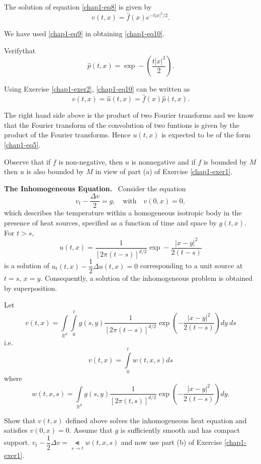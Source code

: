 The solution of equation \eqref{chap1-eq8} is given by
\begin{equation*}
v(t,x)=\hat{f}(x)e^{-t|x|^{2}/2}.\tag{10}\label{chap1-eq10}
\end{equation*}

We have used \eqref{chap1-eq9} in obtaining \eqref{chap1-eq10}.

\begin{exercise}\label{chap1-exer2}
Verify\pageoriginale that 
$$
\hat{p}(t,x)=\exp -\left(\frac{t|x|^{2}}{2}\right).
$$
\end{exercise}

Using Exercise \ref{chap1-exer2}, \eqref{chap1-eq10} can be written as
\begin{equation*}
v(t,x)=\hat{u}(t,x)=\hat{f}(x)\hat{p}(t,x).\tag{11}\label{chap1-eq11}
\end{equation*}

The right hand side above is the product of two Fourier transforms and
we know that the Fourier transform of the convolution of two funtions
is given by the product of the Fourier transforms. Hence $u(t,x)$ is
expected to be of the form \eqref{chap1-eq5}.

Observe that if $f$ is non-negative, then $u$ is nonnegative and if
$f$ is bounded by $M$ then $u$ is also bounded by $M$ in view of part
(a) of Exercise \ref{chap1-exer1}.

\medskip
\noindent
{\bf The Inhomogeneous Equation.}~ Consider the equation
$$
v_{t}-\frac{\Delta v}{2}=g,\quad\text{with}\quad v(0,x)=0,
$$
which describes the temperature within a homogeneous isotropic body in
the presence of heat sources, specified as a function of time and
space by $g(t,x)$. For $t>s$,
$$
u(t,x)=\frac{1}{[2\pi(t-s)]^{d/2}}\exp -\frac{|x-y|^{2}}{2(t-s)}
$$
is a solution of $u_{t}(t,x)-\dfrac{1}{2}\Delta u(t,x)=0$
corresponding to a unit source at $t=s$, $x=y$. Consequently, a
solution of the inhomogeneous problem is obtained by superposition.

Let
$$
v(t,x)=\int\limits_{\mathbb{R}^{d}}\int\limits^{t}_{0}g(s,y)\frac{1}{[2\pi(t-s)]^{d/2}}\exp
\left(-\frac{|x-y|^{2}}{2(t-s)}\right)dy\ ds
$$
i.e.\pageoriginale
$$
v(t,x)=\int\limits^{t}_{0}w(t,x,s)ds
$$
where
$$
w(t,x,s)=\int\limits_{\mathbb{R}^{d}}g(s,y)\frac{1}{[2\pi(t,s)]^{d/2}}\exp\left(-\frac{|x-y|^{2}}{2(t-s)}\right)dy.
$$

\begin{exercise}\label{chap1-exer3}
Show that $v(t,x)$ defined above solves the inhomogeneous heat
equation and satisfies $v(0,x)=0$. Assume that $g$ is sufficiently
smooth and has compact support. $v_{t}-\dfrac{1}{2}\Delta
v=\Lt\limits_{s\to t}w(t,x,s)$ and now use part (b) of Exercise
\eqref{chap1-exer1}. 
\end{exercise}

